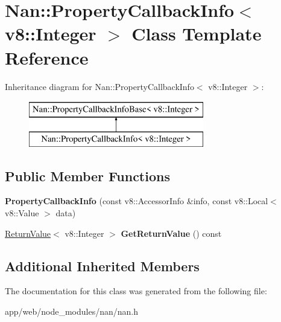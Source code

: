 \hypertarget{class_nan_1_1_property_callback_info_3_01v8_1_1_integer_01_4}{}\section{Nan\+:\+:Property\+Callback\+Info$<$ v8\+:\+:Integer $>$ Class Template Reference}
\label{class_nan_1_1_property_callback_info_3_01v8_1_1_integer_01_4}
Inheritance diagram for Nan\+:\+:Property\+Callback\+Info$<$ v8\+:\+:Integer $>$\+:\begin{figure}[H]
\begin{center}
\leavevmode
\includegraphics[height=2.000000cm]{class_nan_1_1_property_callback_info_3_01v8_1_1_integer_01_4}
\end{center}
\end{figure}
\subsection*{Public Member Functions}
\begin{DoxyCompactItemize}
\item 
\mbox{\label{class_nan_1_1_property_callback_info_3_01v8_1_1_integer_01_4_a0b830bae6710eb72eed675249145a078}} 
{\bfseries Property\+Callback\+Info} (const v8\+::\+Accessor\+Info \&info, const v8\+::\+Local$<$ v8\+::\+Value $>$ data)
\item 
\mbox{\label{class_nan_1_1_property_callback_info_3_01v8_1_1_integer_01_4_a2aeeeb6d0da2e46def9ebdcf81a3168c}} 
\hyperlink{class_nan_1_1_return_value}{Return\+Value}$<$ v8\+::\+Integer $>$ {\bfseries Get\+Return\+Value} () const
\end{DoxyCompactItemize}
\subsection*{Additional Inherited Members}


The documentation for this class was generated from the following file\+:\begin{DoxyCompactItemize}
\item 
app/web/node\+\_\+modules/nan/nan.\+h\end{DoxyCompactItemize}
